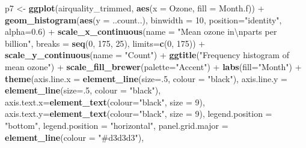 \documentclass[]{article}
\newenvironment{Shaded}{\begin{snugshade}}{\end{snugshade}}
\newcommand{\KeywordTok}[1]{\textcolor[rgb]{0.13,0.29,0.53}{\textbf{{#1}}}}
\newcommand{\DataTypeTok}[1]{\textcolor[rgb]{0.13,0.29,0.53}{{#1}}}
\newcommand{\DecValTok}[1]{\textcolor[rgb]{0.00,0.00,0.81}{{#1}}}
\newcommand{\FloatTok}[1]{\textcolor[rgb]{0.00,0.00,0.81}{{#1}}}
\newcommand{\CharTok}[1]{\textcolor[rgb]{0.31,0.60,0.02}{{#1}}}
\newcommand{\StringTok}[1]{\textcolor[rgb]{0.31,0.60,0.02}{{#1}}}
\newcommand{\NormalTok}[1]{{#1}}
\begin{document}
\begin{Shaded}
\begin{Highlighting}[]
\NormalTok{p7 <-}\StringTok{ }\KeywordTok{ggplot}\NormalTok{(airquality_trimmed, }\KeywordTok{aes}\NormalTok{(}\DataTypeTok{x =} \NormalTok{Ozone, }\DataTypeTok{fill =} \NormalTok{Month.f)) +}\StringTok{ }
\StringTok{      }\KeywordTok{geom_histogram}\NormalTok{(}\KeywordTok{aes}\NormalTok{(}\DataTypeTok{y =} \NormalTok{..count..), }\DataTypeTok{binwidth =} \DecValTok{10}\NormalTok{,}
                     \DataTypeTok{position=}\StringTok{"identity"}\NormalTok{, }\DataTypeTok{alpha=}\FloatTok{0.6}\NormalTok{) +}
\StringTok{      }\KeywordTok{scale_x_continuous}\NormalTok{(}\DataTypeTok{name =} \StringTok{"Mean ozone in}\CharTok{\textbackslash{}n}\StringTok{parts per billion"}\NormalTok{, }
                         \DataTypeTok{breaks =} \KeywordTok{seq}\NormalTok{(}\DecValTok{0}\NormalTok{, }\DecValTok{175}\NormalTok{, }\DecValTok{25}\NormalTok{),}
                         \DataTypeTok{limits=}\KeywordTok{c}\NormalTok{(}\DecValTok{0}\NormalTok{, }\DecValTok{175}\NormalTok{)) +}
\StringTok{      }\KeywordTok{scale_y_continuous}\NormalTok{(}\DataTypeTok{name =} \StringTok{"Count"}\NormalTok{) +}
\StringTok{      }\KeywordTok{ggtitle}\NormalTok{(}\StringTok{"Frequency histogram of mean ozone"}\NormalTok{) +}
\StringTok{      }\KeywordTok{scale_fill_brewer}\NormalTok{(}\DataTypeTok{palette=}\StringTok{"Accent"}\NormalTok{) +}
\StringTok{      }\KeywordTok{labs}\NormalTok{(}\DataTypeTok{fill=}\StringTok{"Month"}\NormalTok{) +}
\StringTok{      }\KeywordTok{theme}\NormalTok{(}\DataTypeTok{axis.line.x =} \KeywordTok{element_line}\NormalTok{(}\DataTypeTok{size=}\NormalTok{.}\DecValTok{5}\NormalTok{, }\DataTypeTok{colour =} \StringTok{"black"}\NormalTok{),}
            \DataTypeTok{axis.line.y =} \KeywordTok{element_line}\NormalTok{(}\DataTypeTok{size=}\NormalTok{.}\DecValTok{5}\NormalTok{, }\DataTypeTok{colour =} \StringTok{"black"}\NormalTok{),}
            \DataTypeTok{axis.text.x=}\KeywordTok{element_text}\NormalTok{(}\DataTypeTok{colour=}\StringTok{"black"}\NormalTok{, }\DataTypeTok{size =} \DecValTok{9}\NormalTok{), }
            \DataTypeTok{axis.text.y=}\KeywordTok{element_text}\NormalTok{(}\DataTypeTok{colour=}\StringTok{"black"}\NormalTok{, }\DataTypeTok{size =} \DecValTok{9}\NormalTok{), }
            \DataTypeTok{legend.position =} \StringTok{"bottom"}\NormalTok{, }\DataTypeTok{legend.position =} \StringTok{"horizontal"}\NormalTok{,}
            \DataTypeTok{panel.grid.major =} \KeywordTok{element_line}\NormalTok{(}\DataTypeTok{colour =} \StringTok{"#d3d3d3"}\NormalTok{), }

\end{Highlighting}
\end{Shaded}
\end{document}
